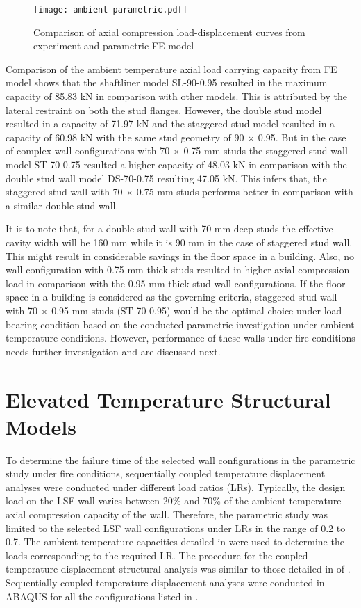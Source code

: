 \begin{figure}[!htbp]
	\centering
	\texttt{[image: ambient-parametric.pdf]}
	\caption{Comparison of axial compression load-displacement curves from experiment and parametric FE model}
	\label{fig:ambient-parametric}
\end{figure}

Comparison of the ambient temperature axial load carrying capacity from FE model shows that the shaftliner model SL-90-0.95 resulted in the maximum capacity of 85.83 kN in comparison with other models. This is attributed by the lateral restraint on both the stud flanges. However, the double stud model resulted in a capacity of 71.97 kN and the staggered stud model resulted in a capacity of 60.98 kN with the same stud geometry of 90 $\times$ 0.95. But in the case of complex wall configurations with 70 $\times$ 0.75 mm studs the staggered stud wall model ST-70-0.75 resulted a higher capacity of 48.03 kN in comparison with the double stud wall model DS-70-0.75 resulting 47.05 kN. This infers that, the staggered stud wall with 70 $\times$ 0.75 mm studs performs better in comparison with a similar double stud wall. 

It is to note that, for a double stud wall with 70 mm deep studs the effective cavity width will be 160 mm while it is 90 mm in the case of staggered stud wall. This might result in considerable savings in the floor space in a building. Also, no wall configuration with 0.75 mm thick studs resulted in higher axial compression load in comparison with the 0.95 mm thick stud wall configurations. If the floor space in a building is considered as the governing criteria, staggered stud wall with 70 $\times$ 0.95 mm studs (ST-70-0.95) would be the optimal choice under load bearing condition based on the conducted parametric investigation under ambient temperature conditions. However, performance of these walls under fire conditions needs further investigation and are discussed next.  

\section{Elevated Temperature Structural Models}

To determine the failure time of the selected wall configurations in the parametric study under fire conditions, sequentially coupled temperature displacement analyses were conducted under different load ratios (LRs). Typically, the design load on the LSF wall varies between 20\% and 70\% of the ambient temperature axial compression capacity of the wall. Therefore, the parametric study was limited to the selected LSF wall configurations under LRs in the range of 0.2 to 0.7. The ambient temperature capacities detailed in  were used to determine the loads corresponding to the required LR. The procedure for the coupled temperature displacement structural analysis was similar to those detailed in  of . Sequentially coupled temperature displacement analyses were conducted in ABAQUS for all the configurations listed in . 


